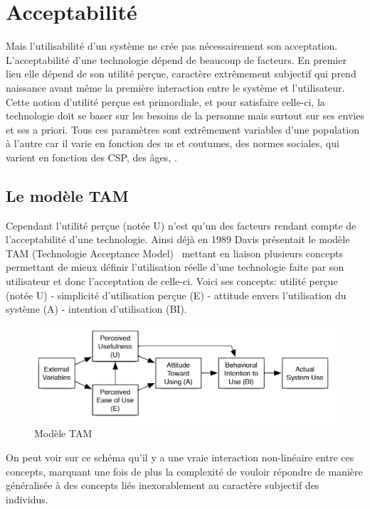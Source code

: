 \section{Acceptabilité}\label{sec:acceptable}
    Mais l'utilisabilité d'un système ne crée pas nécessairement son acceptation. L'acceptabilité d'une technologie dépend de beaucoup de facteurs. En premier lieu elle dépend de son utilité perçue, caractère extrêmement subjectif qui prend naissance avant même la première interaction entre le système et l'utilisateur. 
    Cette notion d'utilité perçue est primordiale, et pour satisfaire celle-ci, la technologie doit se baser sur les besoins de la personne mais surtout sur ses envies et ses a priori. Tous ces paramètres sont extrêmement variables d'une population à l'autre car il varie en fonction des us et coutumes, des normes sociales, qui varient en fonction des CSP, des âges, \etc. 
    \subsection{Le modèle TAM}
        Cependant l'utilité perçue (notée U) n'est qu'un des facteurs rendant compte de l'acceptabilité d'une technologie. Ainsi déjà en 1989 Davis présentait le modèle TAM (Technologie Acceptance Model)~ mettant en liaison plusieurs concepts permettant de mieux définir l'utilisation réelle d'une technologie faite par son utilisateur et donc l'acceptation de celle-ci. Voici ses concepts: utilité perçue (notée U) - simplicité d'utilisation perçue (E) - attitude envers l'utilisation du système (A) - intention d'utilisation (BI). 
        \begin{figure}[!h]
              \centering
              \label{fig:TamModel}\includegraphics[width=\linewidth]{Figures/Davis-TAM_Model.png}
              \caption{Modèle TAM~}
        \end{figure}\par%
        On peut voir sur ce schéma qu'il y a une vraie interaction non-linéaire entre ces concepts, marquant une fois de plus la complexité de vouloir répondre de manière généralisée à des concepts liés inexorablement au caractère subjectif des individus. 
